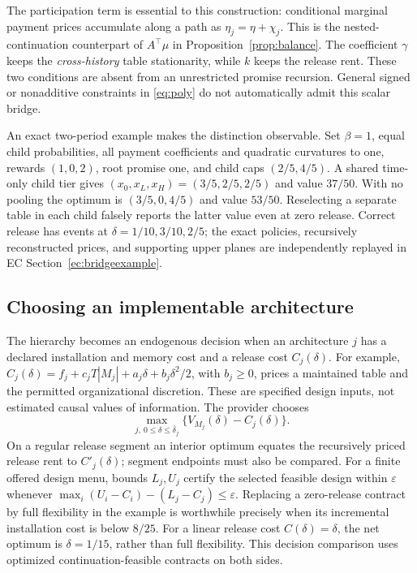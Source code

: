 The participation term is essential to this construction: conditional marginal payment prices accumulate along a path as $\eta_j=\eta+\chi_j$. This is the nested-continuation counterpart of $A^\top\mu$ in Proposition~\ref{prop:balance}. The coefficient $\gamma$ keeps the \emph{cross-history} table stationarity, while $k$ keeps the release rent. These two conditions are absent from an unrestricted promise recursion. General signed or nonadditive constraints in \eqref{eq:poly} do not automatically admit this scalar bridge.

An exact two-period example makes the distinction observable. Set $\beta=1$, equal child probabilities, all payment coefficients and quadratic curvatures to one, rewards $(1,0,2)$, root promise one, and child caps $(2/5,4/5)$. A shared time-only child tier gives $(x_0,x_L,x_H)=(3/5,2/5,2/5)$ and value $37/50$. With no pooling the optimum is $(3/5,0,4/5)$ and value $53/50$. Reselecting a separate table in each child falsely reports the latter value even at zero release. Correct release has events at $\delta=1/10,3/10,2/5$; the exact policies, recursively reconstructed prices, and supporting upper planes are independently replayed in EC Section~\ref{ec:bridgeexample}.

\subsection{Choosing an implementable architecture}\label{sec:design}
The hierarchy becomes an endogenous decision when an architecture $j$ has a declared installation and memory cost and a release cost $C_j(\delta)$. For example, $C_j(\delta)=f_j+c_jT|M_j|+a_j\delta+b_j\delta^2/2$, with $b_j\geq0$, prices a maintained table and the permitted organizational discretion. These are specified design inputs, not estimated causal values of information. The provider chooses
\[
 \max_{j,\ 0\leq\delta\leq\bar\delta_j}\{V_{M_j}(\delta)-C_j(\delta)\}.
\]
On a regular release segment an interior optimum equates the recursively priced release rent to $C'_j(\delta)$; segment endpoints must also be compared. For a finite offered design menu, bounds $L_j,U_j$ certify the selected feasible design within $\varepsilon$ whenever $\max_i(U_i-C_i)-(L_j-C_j)\leq\varepsilon$. Replacing a zero-release contract by full flexibility in the example is worthwhile precisely when its incremental installation cost is below $8/25$. For a linear release cost $C(\delta)=\delta$, the net optimum is $\delta=1/15$, rather than full flexibility. This decision comparison uses optimized continuation-feasible contracts on both sides.
